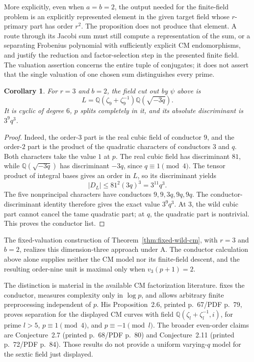\documentclass[11pt]{article}
\newtheorem{corollary}[theorem]{Corollary}
\theoremstyle{definition}
\theoremstyle{remark}
\begin{document}
More explicitly, even when \(a=b=2\), the output needed for the
finite-field problem is an explicitly represented element in the
given target field whose \(r\)-primary part has order \(r^2\).
The proposition does not produce that element. A route through its
Jacobi sum must still compute a representation of the sum, or a
separating Frobenius polynomial with sufficiently explicit CM
endomorphisms, and justify the reduction and factor-selection step
in the presented finite field. The valuation assertion concerns
the entire tuple of conjugates; it does not assert that the single
valuation of one chosen sum distinguishes every prime.

\begin{corollary}\label{cor:sextic-cm-field}
For \(r=3\) and \(b=2\), the field cut out by \(\psi\) above is
\[
 L=\mathbb Q(\zeta_9+\zeta_9^{-1})
       \mathbb Q(\sqrt{-3q}).
\]
It is cyclic of degree \(6\), \(p\) splits completely in it, and
its absolute discriminant is \(3^9q^3\).
\end{corollary}
\begin{proof}
Indeed, the order-\(3\) part is the real cubic field of conductor
\(9\), and the order-\(2\) part is the product of the quadratic
characters of conductors \(3\) and \(q\). Both characters take
the value \(1\) at \(p\). The real cubic field has discriminant
\(81\), while \(\mathbb Q(\sqrt{-3q})\) has discriminant
\(-3q\), since \(q\equiv1\pmod4\). The tensor product of integral
bases gives an order in \(L\), so its discriminant yields
\[
 |D_L|\leq81^2(3q)^3=3^{11}q^3.
\]
The five nonprincipal characters have conductors
\(9,9,3q,9q,9q\). The conductor-discriminant identity therefore
gives the exact value \(3^9q^3\). At \(3\), the wild cubic
part cannot cancel the tame quadratic part; at \(q\), the
quadratic part is nontrivial. This proves the conductor list.
\end{proof}
The fixed-valuation construction of
Theorem~\ref{thm:fixed-wild-cm}, with \(r=3\) and \(b=2\),
realizes this dimension-three approach under \(\mathrm A\).
The conductor calculation above alone supplies neither the CM model
nor its finite-field descent, and the resulting order-nine unit is
maximal only when \(v_3(p+1)=2\).

The distinction is material in the available CM factorization
literature. \citet[Chapter~III, printed p.~50/PDF p.~62]{Boyer2014}
fixes the conductor, measures complexity only in \(\log p\), and
allows arbitrary finite preprocessing independent of \(p\).
His Proposition~2.6, printed p.~67/PDF p.~79, proves separation
for the displayed CM curves with field
\(\mathbb Q(\zeta_l+\zeta_l^{-1},i)\), for prime \(l>5\),
\(p\equiv1\pmod4\), and \(p\equiv-1\pmod l\).
The broader even-order claims are Conjecture~2.7
(printed p.~68/PDF p.~80) and Conjecture~2.11
(printed p.~72/PDF p.~84). Those results do not provide a uniform
varying-\(q\) model for the sextic field just displayed.
\end{document}

